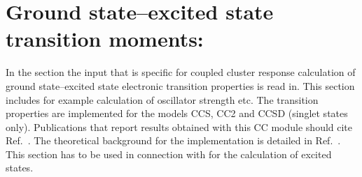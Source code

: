 
\section{Ground state--excited state transition moments: }
\label{sec:cclrsd}


In the  section the input that is
specific for coupled cluster response calculation of ground state--excited state
electronic transition properties is read in.
This section includes for example calculation of oscillator strength etc.
The transition properties are implemented for the models CCS, CC2 and CCSD
(singlet states only).
Publications that report results obtained with this CC module should cite 
Ref.\ \cite{Christiansen:CCLR}.
The theoretical background for the implementation is detailed in Ref.\ \cite{Christiansen:QEL}.
This section  has to be used in connection with  
for the calculation of excited states.

